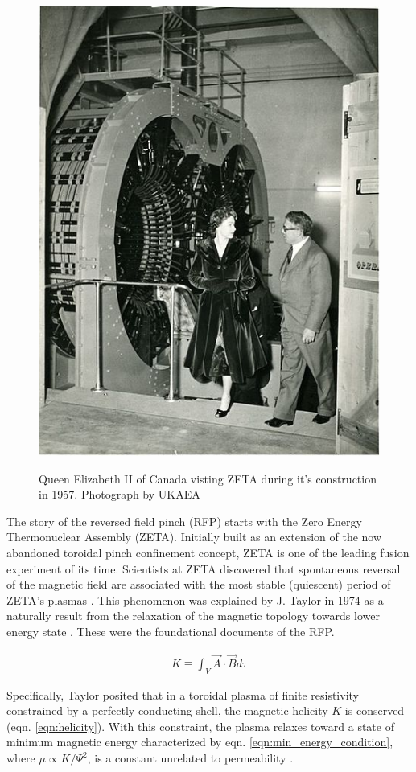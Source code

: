 \begin{refsection}
\begin{figure}[!htb]
	\centering
	\includegraphics[width = 0.75\linewidth]{./1_Introduction/queen_at_zeta.jpg}
    \label{fig:Queen_at_ZETA}
    \caption[Queen Elizabeth II at the ZETA experiment]{Queen Elizabeth II of Canada visting ZETA during it's construction in 1957. Photograph by UKAEA}
\end{figure}%

The story of the reversed field pinch (RFP) starts with the Zero Energy Thermonuclear Assembly (ZETA). Initially built as an extension of the now abandoned toroidal pinch confinement concept, ZETA is one of the leading fusion experiment of its time. Scientists at ZETA discovered that spontaneous reversal of the magnetic field are associated with the most stable (quiescent) period of ZETA's plasmas \cite{Butt1966,Robinson1969}. This phenomenon was explained by J. Taylor in 1974 as a naturally result from the relaxation of the magnetic topology towards lower energy state \cite{Taylor1974}. These were the foundational documents of the RFP.

\begin{align}\label{eqn:helicity}
	K \equiv \int_{V} \vec{A} \cdot \vec{B} d\tau
\end{align}

Specifically, Taylor posited that in a toroidal plasma of finite resistivity constrained by a perfectly conducting shell, the magnetic helicity $K$ is conserved (eqn. \ref{eqn:helicity}). With this constraint, the plasma relaxes toward a state of minimum magnetic energy characterized by eqn. \ref{eqn:min_energy_condition}, where $\mu \varpropto K/ \Psi ^2$, is a constant unrelated to permeability . 


\end{refsection}
